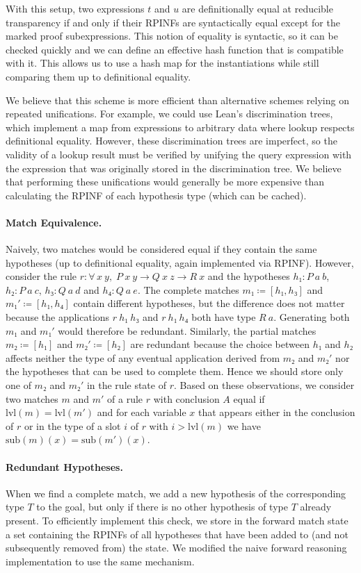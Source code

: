 \documentclass[runningheads]{llncs}
\newcommand{\All}[2]{\ensuremath{\forall\, #1,\; #2}}
\newcommand{\sub}{\ensuremath{\mathrm{sub}}}
\newcommand{\lvl}{\ensuremath{\mathrm{lvl}}}
\begin{document}
With this setup, two expressions $t$ and $u$ are definitionally equal at reducible transparency if and only if their RPINFs are syntactically equal except for the marked proof subexpressions.
This notion of equality is syntactic, so it can be checked quickly and we can define an effective hash function that is compatible with it.
This allows us to use a hash map for the instantiations while still comparing them up to definitional equality.

We believe that this scheme is more efficient than alternative schemes relying on repeated unifications.
For example, we could use Lean's discrimination trees, which implement a map from expressions to arbitrary data where lookup respects definitional equality.
However, these discrimination trees are imperfect, so the validity of a lookup result must be verified by unifying the query expression with the expression that was originally stored in the discrimination tree.
We believe that performing these unifications would generally be more expensive than calculating the RPINF of each hypothesis type (which can be cached).

\paragraph{Match Equivalence.}
Naively, two matches would be considered equal if they contain the same hypotheses (up to definitional equality, again implemented via RPINF).
However, consider the rule $r : \All{x~y}{P~x~y → Q~x~z → R~x}$ and the hypotheses $h₁ : P~a~b$, $h₂ : P~a~c$, $h₃ : Q~a~d$ and $h₄ : Q~a~e$.
The complete matches $m₁ ≔ [h₁, h₃]$ and $m₁' ≔ [h₁, h₄]$ contain different hypotheses, but the difference does not matter because the applications $r~h₁~h₃$ and $r~h₁~h₄$ both have type $R~a$.
Generating both $m₁$ and $m₁'$ would therefore be redundant.
Similarly, the partial matches $m₂ ≔ [h₁]$ and $m₂' ≔ [h₂]$ are redundant because the choice between $h₁$ and $h₂$ affects neither the type of any eventual application derived from $m₂$ and $m₂'$ nor the hypotheses that can be used to complete them.
Hence we should store only one of $m₂$ and $m₂'$ in the rule state of $r$.
Based on these observations, we consider two matches $m$ and $m'$ of a rule $r$ with conclusion $A$ equal if $\lvl(m) = \lvl(m')$ and for each variable $x$ that appears either in the conclusion of $r$ or in the type of a slot $i$ of $r$ with $i > \lvl(m)$ we have $\sub(m)(x) = \sub(m')(x)$.

\paragraph{Redundant Hypotheses.}
When we find a complete match, we add a new hypothesis of the corresponding type $T$ to the goal, but only if there is no other hypothesis of type $T$ already present.
To efficiently implement this check, we store in the forward match state a set containing the RPINFs of all hypotheses that have been added to (and not subsequently removed from) the state.
We modified the naive forward reasoning implementation to use the same mechanism.
\end{document}
